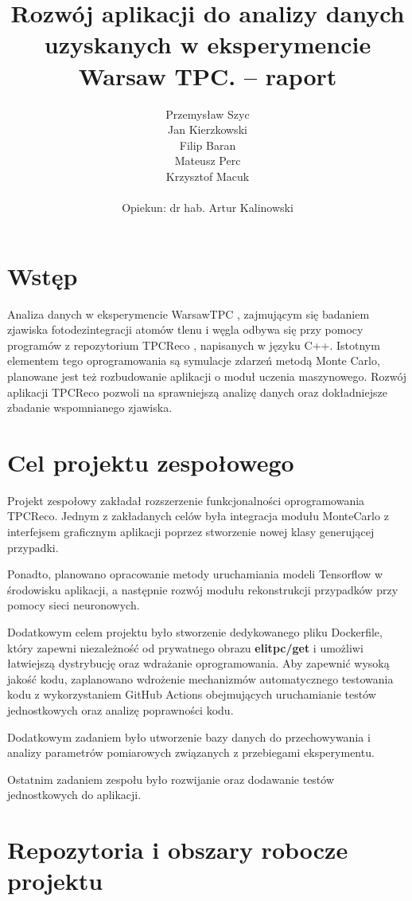 \documentclass{article}
\title{Rozwój aplikacji do analizy danych uzyskanych w eksperymencie Warsaw TPC. -- raport}
\author{ Przemysław Szyc \\ Jan Kierzkowski \\ Filip Baran \\ Mateusz Perc \\ Krzysztof Macuk \\\\ Opiekun: dr hab. Artur Kalinowski}
\begin{document}
\maketitle

\section{Wstęp}
Analiza danych w eksperymencie WarsawTPC \cite{WAWTPC}, zajmującym się badaniem zjawiska fotodezintegracji atomów tlenu i węgla odbywa się przy pomocy programów z repozytorium TPCReco \cite{TPCReco}, napisanych w języku C++. Istotnym elementem tego oprogramowania są symulacje zdarzeń metodą Monte Carlo, planowane jest też rozbudowanie aplikacji o moduł uczenia maszynowego.
Rozwój aplikacji TPCReco pozwoli na sprawniejszą analizę danych oraz dokładniejsze zbadanie wspomnianego zjawiska.

\section{Cel projektu zespołowego}

Projekt zespołowy zakładał rozszerzenie funkcjonalności oprogramowania TPCReco. Jednym z zakładanych celów była integracja modułu MonteCarlo z interfejsem graficznym aplikacji poprzez stworzenie nowej klasy generującej przypadki.

Ponadto, planowano opracowanie metody uruchamiania modeli Tensorflow\cite{TensorFlow} w środowisku aplikacji, a następnie rozwój modułu rekonstrukcji przypadków przy pomocy sieci neuronowych.

Dodatkowym celem projektu było stworzenie dedykowanego pliku Dockerfile, który zapewni niezależność od prywatnego obrazu \textbf{elitpc/get} i umożliwi łatwiejszą dystrybucję oraz wdrażanie oprogramowania. 
Aby zapewnić wysoką jakość kodu, zaplanowano wdrożenie mechanizmów automatycznego testowania kodu z wykorzystaniem GitHub Actions\cite{Actions} obejmujących uruchamianie testów jednostkowych oraz analizę poprawności kodu.

Dodatkowym zadaniem było utworzenie bazy danych do przechowywania i analizy parametrów pomiarowych związanych z przebiegami eksperymentu.

Ostatnim zadaniem zespołu było rozwijanie oraz dodawanie testów jednostkowych do aplikacji.
\section{Repozytoria i obszary robocze projektu}
\end{document}
